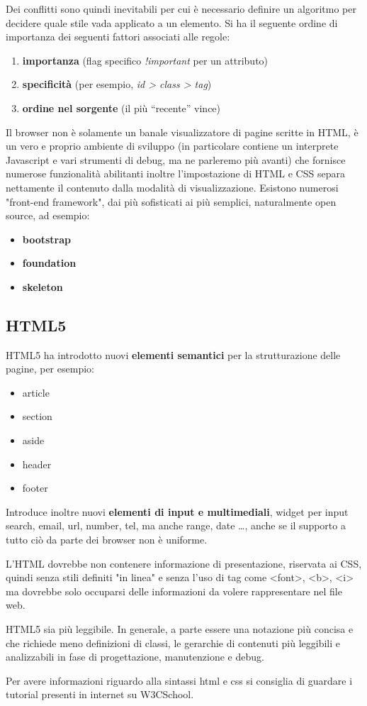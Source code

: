\documentclass[a4paper,12pt, oneside]{book}
\begin{document}
Dei conflitti sono quindi inevitabili per cui è necessario definire un algoritmo per decidere quale
stile vada applicato a un elemento.\newline
Si ha il seguente ordine di importanza dei seguenti fattori associati alle regole:
\begin{enumerate}
	\item \textbf{importanza} (flag specifico \textit{!important} per un attributo)
	\item \textbf{specificità} (per esempio, \textit{id > class > tag})
	\item \textbf{ordine nel sorgente }(il più “recente” vince)
\end{enumerate}
Il browser non è solamente un banale visualizzatore di pagine scritte in HTML, è un vero e proprio 
ambiente di sviluppo (in particolare contiene un interprete Javascript e vari strumenti di debug,
ma ne parleremo più avanti) che fornisce numerose funzionalità abilitanti inoltre l'impostazione di
HTML e CSS separa nettamente il contenuto dalla modalità di visualizzazione.\newline
Esistono numerosi "front-end framework", dai più sofisticati ai più semplici, naturalmente open source, ad esempio:
\begin{itemize}
	\item \textbf{bootstrap}
	\item \textbf{foundation}
	\item \textbf{skeleton}
\end{itemize}

\subsection{HTML5}
HTML5 ha introdotto nuovi \textbf{elementi semantici} per la strutturazione delle pagine, per esempio:
\begin{itemize}
	\item article
	\item section
	\item aside
	\item header
	\item footer
\end{itemize}
Introduce inoltre nuovi \textbf{elementi di input e multimediali}, widget per input search, email,
url, number, tel, ma anche range, date \dots,  anche se il supporto a tutto ciò da parte dei browser non è uniforme.

L’HTML dovrebbe non contenere informazione di presentazione, riservata ai CSS, 
quindi senza stili definiti "in linea" e senza l'uso di tag come <font>, <b>, <i> ma dovrebbe solo 
occuparsi delle informazioni da volere rappresentare nel file web.

HTML5 sia più leggibile. In generale, a parte essere una notazione più concisa e che richiede
meno definizioni di classi, le gerarchie di contenuti più leggibili e analizzabili 
in fase di progettazione, manutenzione e debug.

Per avere informazioni riguardo alla sintassi html e css si consiglia di guardare i tutorial presenti 
in internet su W3CSchool.
\end{document}

